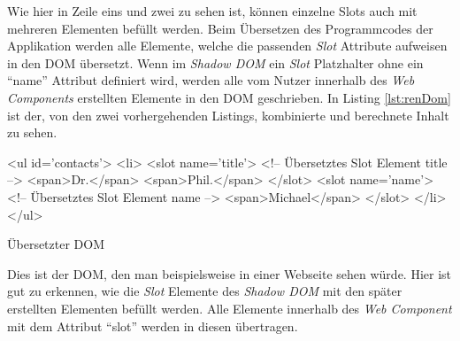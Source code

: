 \documentclass[12pt, paper=a4, bibtotoc, toc=listof, headsepline=true, numbers=endperiod]{scrreprt}
\begin{document}
		Wie hier in Zeile eins und zwei zu sehen ist, können einzelne Slots auch mit mehreren Elementen befüllt werden. Beim Übersetzen des Programmcodes der Applikation werden alle Elemente, welche die passenden \emph{Slot} Attribute aufweisen in den \ac{DOM} übersetzt. Wenn im \emph{Shadow \ac{DOM}} ein \emph{Slot} Platzhalter ohne ein \enquote{name} Attribut definiert wird, werden alle vom Nutzer innerhalb des \emph{Web Components} erstellten Elemente in den \ac{DOM} geschrieben.
		In Listing \ref{lst:renDom} ist der, von den zwei vorhergehenden Listings,  kombinierte und berechnete Inhalt zu sehen.
		\begin{listing}
			\begin{HTMLcode*}{}
<ul id='contacts'>
	<li>
		<slot name='title'> <!-- Übersetztes Slot Element title -->
			<span>Dr.</span>
			<span>Phil.</span>
		</slot>
		<slot name='name'> <!-- Übersetztes Slot Element name -->
			<span>Michael</span>
		</slot>
	</li>
</ul>
			\end{HTMLcode*}
			\caption{Übersetzter DOM}
			\label{lst:renDom}
		\end{listing}\noindent
		Dies ist der \ac{DOM}, den man beispielsweise in einer Webseite sehen würde. Hier ist gut zu erkennen, wie die \emph{Slot} Elemente des \emph{Shadow \ac{DOM}} mit den später erstellten Elementen befüllt werden. Alle Elemente innerhalb des \emph{Web Component} mit dem Attribut \enquote{slot} werden in diesen übertragen.
\end{document}
